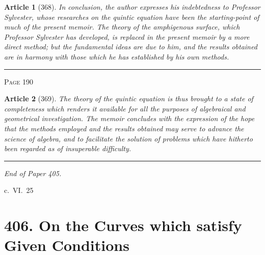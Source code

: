 \documentclass[11pt,a4paper]{article}
\theoremstyle{cayley}
\newtheorem{art}{Article}
\begin{document}
\begin{art}[368]
In conclusion, the author expresses his indebtedness to Professor Sylvester, whose researches on the quintic equation have been the starting-point of much of the present memoir. The theory of the amphigenous surface, which Professor Sylvester has developed, is replaced in the present memoir by a more direct method; but the fundamental ideas are due to him, and the results obtained are in harmony with those which he has established by his own methods.
\end{art}

\vspace{1em}
\noindent\rule{\textwidth}{0.4pt}
\begin{center}\textsc{Page 190}\end{center}
\newpage

\begin{art}[369]
The theory of the quintic equation is thus brought to a state of completeness which renders it available for all the purposes of algebraical and geometrical investigation. The memoir concludes with the expression of the hope that the methods employed and the results obtained may serve to advance the science of algebra, and to facilitate the solution of problems which have hitherto been regarded as of insuperable difficulty.
\end{art}

\vspace{2em}
\begin{center}
\rule{0.5\textwidth}{0.4pt}
\end{center}

\begin{center}
\textit{End of Paper 405.}
\end{center}

\vspace{2em}
\hspace{\fill}c.~VI.\ 25
\newpage

\section*{406. On the Curves which satisfy Given Conditions}
\end{document}
